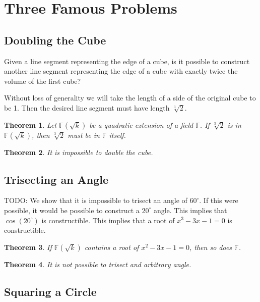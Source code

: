 \documentclass[11pt]{article}
\newtheorem{theorem}{Theorem}[section]
\theoremstyle{definition}
\begin{document}
\section{Three Famous Problems}

\subsection{Doubling the Cube}

Given a line segment representing the edge of a cube, is it possible to construct another line segment representing the edge of a cube with exactly
twice the volume of the first cube?

Without loss of generality we will take the length of a side of the original cube to be 1. Then the desired line segment must have length $\sqrt[3]{2}$.

\begin{theorem}
  Let $\mathbb{F}(\sqrt{k})$ be a quadratic extension of a field $\mathbb{F}$. If $\sqrt[3]{2}$ is in $\mathbb{F}(\sqrt{k})$, then $\sqrt[3]{2}$ must be in $\mathbb{F}$ itself.
  \label{theorem: cube root of 2}
\end{theorem}

\begin{theorem}
  It is impossible to double the cube.
  \label{theorem: can't double cube}
\end{theorem}

\subsection{Trisecting an Angle}

TODO: We show that it is impossible to trisect an angle of $60^\circ$. If this were possible, it would be possible to construct a $20^\circ$ angle. This implies that $\cos(20^\circ)$ is constructible.
This implies that a root of $x^3-3x  -1 =0$ is constructible.

\begin{theorem}
  If $\mathbb{F}(\sqrt{k})$ contains a root of $x^2-3x-1=0$, then so does $\mathbb{F}$.
  \label{theorem: trisecting set up}
\end{theorem}

\begin{theorem}
  It is not possible to trisect and arbitrary angle.
  \label{theorem: can't trisect arbitrary angle}
\end{theorem}

\subsection{Squaring a Circle}
\end{document}
